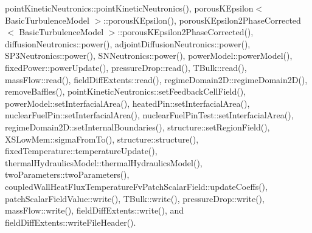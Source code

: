 point\+Kinetic\+Neutronics\+::point\+Kinetic\+Neutronics(), porous\+K\+Epsilon$<$ Basic\+Turbulence\+Model $>$\+::porous\+K\+Epsilon(), porous\+K\+Epsilon2\+Phase\+Corrected$<$ Basic\+Turbulence\+Model $>$\+::porous\+K\+Epsilon2\+Phase\+Corrected(), diffusion\+Neutronics\+::power(), adjoint\+Diffusion\+Neutronics\+::power(), S\+P3\+Neutronics\+::power(), S\+N\+Neutronics\+::power(), power\+Model\+::power\+Model(), fixed\+Power\+::power\+Update(), pressure\+Drop\+::read(), T\+Bulk\+::read(), mass\+Flow\+::read(), field\+Diff\+Extents\+::read(), regime\+Domain2\+D\+::regime\+Domain2\+D(), remove\+Baffles(), point\+Kinetic\+Neutronics\+::set\+Feedback\+Cell\+Field(), power\+Model\+::set\+Interfacial\+Area(), heated\+Pin\+::set\+Interfacial\+Area(), nuclear\+Fuel\+Pin\+::set\+Interfacial\+Area(), nuclear\+Fuel\+Pin\+Test\+::set\+Interfacial\+Area(), regime\+Domain2\+D\+::set\+Internal\+Boundaries(), structure\+::set\+Region\+Field(), X\+S\+Low\+Mem\+::sigma\+From\+To(), structure\+::structure(), fixed\+Temperature\+::temperature\+Update(), thermal\+Hydraulics\+Model\+::thermal\+Hydraulics\+Model(), two\+Parameters\+::two\+Parameters(), coupled\+Wall\+Heat\+Flux\+Temperature\+Fv\+Patch\+Scalar\+Field\+::update\+Coeffs(), patch\+Scalar\+Field\+Value\+::write(), T\+Bulk\+::write(), pressure\+Drop\+::write(), mass\+Flow\+::write(), field\+Diff\+Extents\+::write(), and field\+Diff\+Extents\+::write\+File\+Header().

